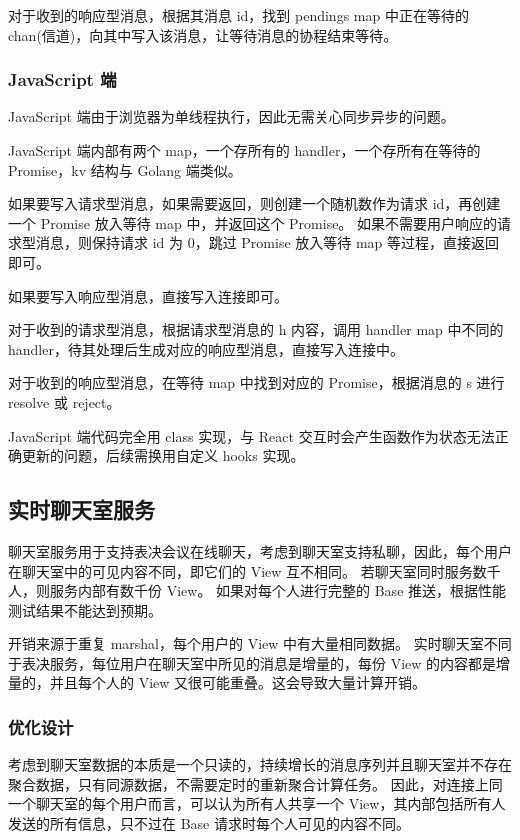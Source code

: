 对于收到的响应型消息，根据其消息 id，找到 pendings map 中正在等待的 chan(信道)，向其中写入该消息，让等待消息的协程结束等待。

\subsubsection{JavaScript 端}
JavaScript 端由于浏览器为单线程执行，因此无需关心同步异步的问题。

JavaScript 端内部有两个 map，一个存所有的 handler，一个存所有在等待的 Promise，kv 结构与 Golang 端类似。

如果要写入请求型消息，如果需要返回，则创建一个随机数作为请求 id，再创建一个 Promise 放入等待 map 中，并返回这个 Promise。
如果不需要用户响应的请求型消息，则保持请求 id 为 0，跳过 Promise 放入等待 map 等过程，直接返回即可。

如果要写入响应型消息，直接写入连接即可。

对于收到的请求型消息，根据请求型消息的 h 内容，调用 handler map 中不同的 handler，待其处理后生成对应的响应型消息，直接写入连接中。

对于收到的响应型消息，在等待 map 中找到对应的 Promise，根据消息的 s 进行 resolve 或 reject。

JavaScript 端代码完全用 class 实现，与 React 交互时会产生函数作为状态无法正确更新的问题，后续需换用自定义 hooks 实现。

\subsection{实时聊天室服务}
聊天室服务用于支持表决会议在线聊天，考虑到聊天室支持私聊，因此，每个用户在聊天室中的可见内容不同，即它们的 View 互不相同。
若聊天室同时服务数千人，则服务内部有数千份 View。
如果对每个人进行完整的 Base 推送，根据性能测试结果不能达到预期。

开销来源于重复 marshal，每个用户的 View 中有大量相同数据。
实时聊天室不同于表决服务，每位用户在聊天室中所见的消息是增量的，每份 View 的内容都是增量的，并且每个人的 View 又很可能重叠。这会导致大量计算开销。

\subsubsection{优化设计}
考虑到聊天室数据的本质是一个只读的，持续增长的消息序列并且聊天室并不存在聚合数据，只有同源数据，不需要定时的重新聚合计算任务。
因此，对连接上同一个聊天室的每个用户而言，可以认为所有人共享一个 View，其内部包括所有人发送的所有信息，只不过在 Base 请求时每个人可见的内容不同。

